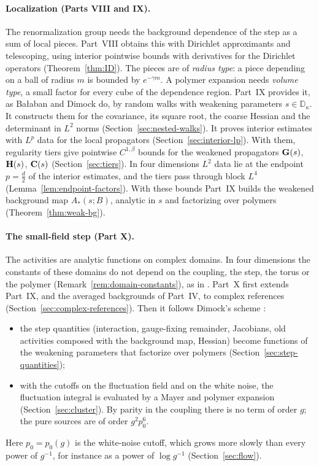 \paragraph{Localization (Parts VIII and IX).} The renormalization group needs the background dependence of the step as a sum of local pieces. Part~VIII obtains this with Dirichlet approximants and telescoping, using interior pointwise bounds with derivatives for the Dirichlet operators (Theorem~\ref{thm:ID}). The pieces are of \emph{radius type}: a piece depending on a ball of radius $m$ is bounded by $e^{-\gamma m}$. A polymer expansion needs \emph{volume type}, a small factor for every cube of the dependence region. Part~IX provides it, as Ba\l aban and Dimock do, by random walks with weakening parameters $s\in\mathbb D_\kappa$. It constructs them for the covariance, its square root, the coarse Hessian and the determinant in $L^2$ norms (Section~\ref{sec:nested-walks}). It proves interior estimates with $L^p$ data for the local propagators (Section~\ref{sec:interior-lp}). With them, regularity tiers give pointwise $C^{1,\beta}$ bounds for the weakened propagators $\mathbf G(s)$, $\mathbf H(s)$, $\mathbf C(s)$ (Section~\ref{sec:tiers}). In four dimensions $L^2$ data lie at the endpoint $p=\frac d2$ of the interior estimates, and the tiers pass through block $L^4$ (Lemma~\ref{lem:endpoint-factors}). With these bounds Part~IX builds the weakened background map $A_*(s;B)$, analytic in $s$ and factorizing over polymers (Theorem~\ref{thm:weak-bg}).

\paragraph{The small-field step (Part X).} The activities are analytic functions on complex domains. In four dimensions the constants of these domains do not depend on the coupling, the step, the torus or the polymer (Remark~\ref{rem:domain-constants}), as in \cite[(1.11)--(1.16)]{BalYM4I}. Part~X first extends Part~IX, and the averaged backgrounds of Part~IV, to complex references (Section~\ref{sec:complex-references}). Then it follows Dimock's scheme \cite{DimockI}:
\begin{itemize}
\item the step quantities (interaction, gauge-fixing remainder, Jacobians, old activities composed with the background map, Hessian) become functions of the weakening parameters that factorize over polymers (Section~\ref{sec:step-quantities});
\item with the cutoffs on the fluctuation field and on the white noise, the fluctuation integral is evaluated by a Mayer and polymer expansion (Section~\ref{sec:cluster}). By parity in the coupling there is no term of order $g$; the pure sources are of order $g^2p_0^6$.
\end{itemize}
Here $p_0=p_0(g)$ is the white-noise cutoff, which grows more slowly than every power of $g^{-1}$, for instance as a power of $\log g^{-1}$ (Section~\ref{sec:flow}).

